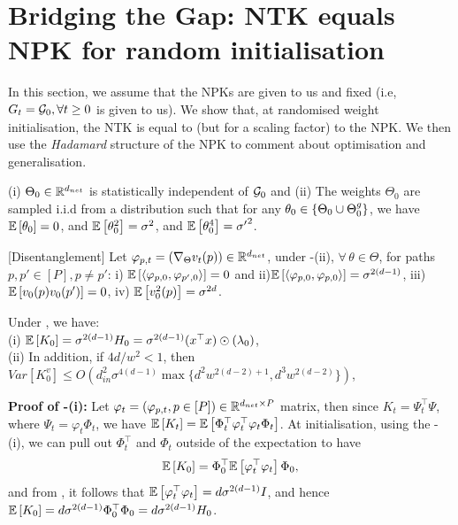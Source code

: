 \section{Bridging the Gap: NTK equals NPK for random initialisation}
In this section, we assume that the NPKs are given to us and fixed (i.e, $G_t=\mathcal{G}_0,\forall t\geq 0$ is given to us). We show that, at randomised weight initialisation, the NTK is equal to (but for a scaling factor) to the NPK. We then use the \emph{Hadamard} structure of the NPK to comment about optimisation and generalisation. 
\begin{assumption}\label{assmp:main}
(i) $\Theta_0\in\mathbb{R}^{d_{net}}$  is statistically independent of $\mathcal{G}_0$ and (ii) The weights $\Theta_0$ are sampled i.i.d from a distribution such that for any $\theta_0\in\{\Theta_0\cup {\Theta}^g_0\}$,  we have $\mathbb{E}\left[\theta_0\right]=0$, and  $\mathbb{E}\left[\theta^2_0\right]=\sigma^2$, and $\mathbb{E}\left[\theta^4_0\right]={\sigma'}^2$.
\end{assumption}
\begin{lemma}\label{lm:disentangle}[Disentanglement] Let $\varphi_{p,t}=(\nabla_{\Theta} v_t(p))\in\mathbb{R}^{d_{net}}$, 
under -(ii), $\forall\,\theta\in\Theta$, for paths $p,p'\in [P], p\neq p'$:  i) $\mathbb{E}\left[\langle \varphi_{p,0},\varphi_{p',0}\rangle\right]= 0$ and ii)$\mathbb{E}\left[\langle \varphi_{p,0},\varphi_{p,0}\rangle\right]= \sigma^{2(d-1)}$, iii) $\mathbb{E}\left[v_0(p)v_0(p')\right]=0$, iv) $\mathbb{E}\left[v^2_0(p)\right]=\sigma^{2d}$.
\end{lemma}
\begin{theorem}\label{th:main} Under , we have:\\
(i) $\mathbb{E}\left[K_0\right]=\sigma^{2(d-1)}H_0=\sigma^{2(d-1)}(x^\top x)\odot(\lambda_0)$,\\
(ii) In addition, if ${4d}/{w^2}<1$, then $Var\left[K^v_0\right]\leq O\left(d^2_{in}\sigma^{4(d-1)}\max\{d^2w^{2(d-2)+1}, d^3w^{2(d-2)}\}\right)$,\\
\end{theorem}
\textbf{Proof of -(i):} Let $\varphi_t=(\varphi_{p,t},p\in[P])\in \mathbb{R}^{d_{net}\times P}$ matrix, then since $K_t=\Psi^\top_t\Psi$, where $\Psi_t=\varphi_t \Phi_t$, we have $\mathbb{E}\left[K_t\right]=\mathbb{E}\left[\Phi^\top_t \varphi^\top_t \varphi_t \Phi_t\right]$. At initialisation, using the -(i), we can pull out $\Phi^\top_t$ and $\Phi_t$ outside of the expectation to have \begin{align}\label{eq:pullout}\mathbb{E}\left[K_0\right]=\Phi^\top_0\mathbb{E}\left[ \varphi^\top_t \varphi_t \right]\Phi_0,\end{align} and from , it follows that $\mathbb{E}\left[ \varphi^\top_t \varphi_t \right]=d\sigma^{2(d-1)}I$, and hence $\mathbb{E}\left[K_0\right]=d\sigma^{2(d-1)}\Phi^\top_0\Phi_0=d\sigma^{2(d-1)}H_0$.\\
